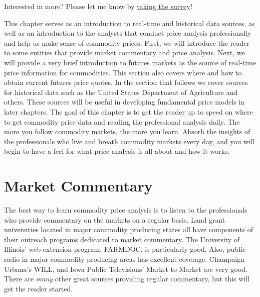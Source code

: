 \documentclass[
  letterpaper,
  DIV=11,
  numbers=noendperiod]{scrreprt}
\begin{document}
{Interested in more? Please let me know by}
\href{https://forms.gle/Q3VByCQZHjfQSy9D7}{taking the survey}!

This chapter serves as an introduction to real-time and historical data
sources, as well as an introduction to the analysts that conduct price
analysis professionally and help us make sense of commodity prices.
First, we will introduce the reader to some entities that provide market
commentary and price analysis. Next, we will provide a very brief
introduction to futures markets as the source of real-time price
information for commodities. This section also covers where and how to
obtain current futures price quotes. In the section that follows we
cover sources for historical data such as the United States Department
of Agriculture and others. These sources will be useful in developing
fundamental price models in later chapters. The goal of this chapter is
to get the reader up to speed on where to get commodity price data and
reading the professional analysis daily. The more you follow commodity
markets, the more you learn. Absorb the insights of the professionals
who live and breath commodity markets every day, and you will begin to
have a feel for what price analysis is all about and how it works.

\hypertarget{market-commentary}{%
\section{Market Commentary}\label{market-commentary}}

The best way to learn commodity price analysis is to listen to the
professionals who provide commentary on the markets on a regular basis.
Land grant universities located in major commodity producing states all
have components of their outreach programs dedicated to market
commentary. The University of Illinois' web extension program, FARMDOC,
is particularly good. Also, public radio in major commodity producing
areas has excellent coverage. Champaign-Urbana's WILL, and Iowa Public
Televisions' Market to Market are very good. There are \emph{many} other
great sources providing regular commentary, but this will get the reader
started.
\end{document}
